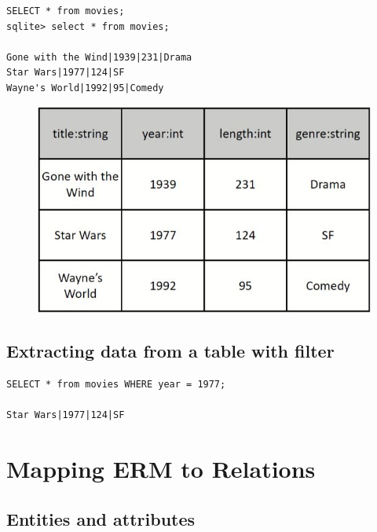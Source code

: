 \documentclass[conference]{IEEEtran}
\begin{document}
\begin{verbatim}
SELECT * from movies;
sqlite> select * from movies;

Gone with the Wind|1939|231|Drama
Star Wars|1977|124|SF
Wayne's World|1992|95|Comedy
\end{verbatim}
\begin{figure} [h!]
    \centering
    \includegraphics[scale=0.5]{Ex17.JPG}
\end{figure}

\subsection{Extracting data from a table with filter}

\begin{verbatim}
SELECT * from movies WHERE year = 1977;

Star Wars|1977|124|SF
\end{verbatim}

\section{Mapping ERM to Relations}
\subsection{Entities and attributes}
\end{document}
